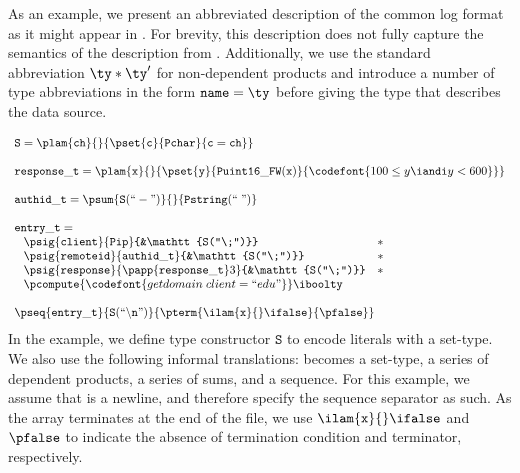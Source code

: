 As an example, we present an abbreviated description of the common log
format as it might appear in \ddc{}. For brevity,
this description does not fully capture the semantics of the
\ipads{} description from . Additionally, we
use the standard abbreviation $\ty * \ty'$ for non-dependent products and introduce a number of type abbreviations
in the form $\mathtt{name} = \ty$ before giving the type that describes the data source.

{\small
\[
\begin{array}{l}
\mathtt{S} = \plam {\mathtt{ch}} {} {\pset {\mathtt{c}}
  {\mathtt{Pchar}} {\mathtt{c = ch}}}\\
\\
\mathtt{response\_t} = \plam {\mathtt x} {} {
      \pset {\mathtt y} {\mathtt{Puint16\_FW(x)}} 
      {\codefont{100 \leq y \iandi y < 600}}
    }\\
\\
\mathtt{authid\_t} = 
\psum {\mathtt{S(``-")}} {} {\mathtt{Pstring(``\;")}}\\
\\
\mathtt{entry\_t} = \\ \;
\begin{array}{lll}
\psig {\mathtt{client}} {\mathtt{Pip}} {&\mathtt{S(``\;")}} &* \\
\psig {\mathtt{remoteid}} {\mathtt{authid\_t}} {&\mathtt{S(``\;")}} &* \\
\psig {\mathtt{response}} {
  \papp
    {\mathtt{response\_t}} 3
}{&\mathtt{S(``\;")}} &*\\
\multicolumn{3}{c}{
\pcompute {\codefont{getdomain\;client = ``edu"}} \iboolty}
\end{array}\\
\\
\pseq {\mathtt{entry\_t}} {\mathtt{S(``\backslash n")}}{
  \pterm {\ilam {\mathtt x} {} \ifalse} {\pfalse}
}
\end{array}
\]}%
\noindent
In the example, we define type constructor $\mathtt{S}$ to encode literals
with a set-type. We also use the following
informal translations: \Pwhere{} becomes a set-type, \Pstruct{} a
series of dependent products, \Punion{} a series of sums, and
\Parray{} a sequence. For this example, we assume that \Peor{} is a newline, and therefore specify the sequence
separator as such. As the array terminates at the end of the file, we
use $\ilam {\mathtt x} {} \ifalse$ and $\pfalse$ to indicate the
absence of termination condition and terminator, respectively.

